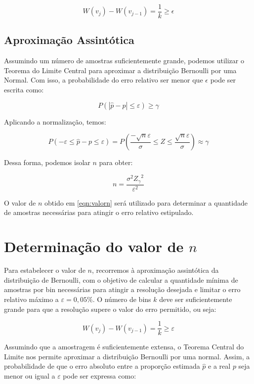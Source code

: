 \documentclass[12pt, a4paper]{article}
\begin{document}
\begin{equation}
    W(v_j) - W(v_{j-1}) = \frac{1}{k} \geq \epsilon
    \label{eqn:valork}
\end{equation}

\subsection{Aproximação Assintótica}

Assumindo um número de amostras suficientemente grande, podemos utilizar o Teorema do Limite Central para aproximar a distribuição Bernoulli por uma Normal. Com isso, a probabilidade do erro relativo ser menor que \( \epsilon \) pode ser escrita como:

\[
P(|\hat{p} - p|\leq \varepsilon)\geq \gamma 
\]

Aplicando a normalização, temos:

\[
P(-\varepsilon \leq \hat{p} - p \leq \varepsilon) = P\left( \frac{-\sqrt{n}\varepsilon}{\sigma} \leq Z \leq \frac{\sqrt{n}\varepsilon}{\sigma}\right) \approx \gamma
\]

Dessa forma, podemos isolar \( n \) para obter:

\begin{equation}
    n = \frac {\sigma^2 {Z_\gamma}^2} {\varepsilon^2}
    \label{eqn:valorn}
\end{equation}

O valor de \( n \) obtido em \ref{eqn:valorn} será utilizado para determinar a quantidade de amostras necessárias para atingir o erro relativo estipulado.

\section{Determinação do valor de \( n \)}

Para estabelecer o valor de \( n \), recorremos à aproximação assintótica da distribuição de Bernoulli, com o objetivo de calcular a quantidade mínima de amostras por bin necessárias para atingir a resolução desejada e limitar o erro relativo máximo a \( \varepsilon = 0{,}05\% \). O número de bins \( k \) deve ser suficientemente grande para que a resolução supere o valor do erro permitido, ou seja:

\begin{equation}
    W(v_j) - W(v_{j-1}) = \frac{1}{k} \geq \varepsilon
    \label{eqn:valork}
\end{equation}

Assumindo que a amostragem é suficientemente extensa, o Teorema Central do Limite nos permite aproximar a distribuição Bernoulli por uma normal. Assim, a probabilidade de que o erro absoluto entre a proporção estimada \( \hat{p} \) e a real \( p \) seja menor ou igual a \( \varepsilon \) pode ser expressa como:
\end{document}
